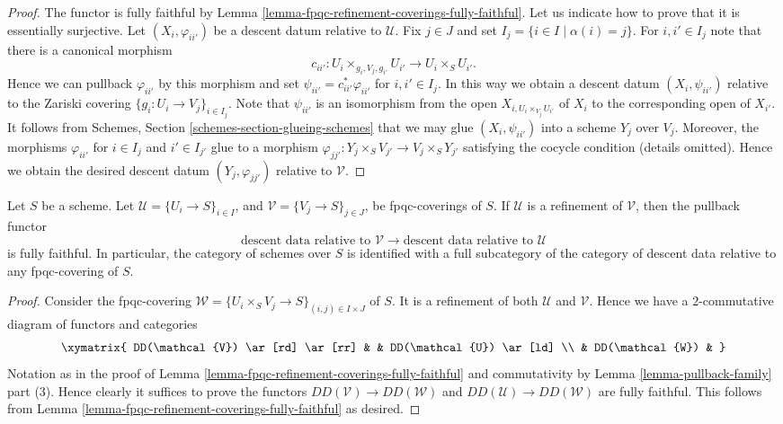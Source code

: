 \begin{proof}
The functor is fully faithful by
Lemma \ref{lemma-fpqc-refinement-coverings-fully-faithful}.
Let us indicate how to prove that it is essentially surjective.
Let $(X_i, \varphi_{ii'})$ be a descent datum relative to $\mathcal{U}$.
Fix $j \in J$ and set $I_j = \{i \in I \mid \alpha(i) = j\}$.
For $i, i' \in I_j$ note that there is a canonical morphism
$$
c_{ii'} : U_i \times_{g_i, V_j, g_{i'}} U_{i'} \to U_i \times_S U_{i'}.
$$
Hence we can pullback $\varphi_{ii'}$ by this morphism
and set $\psi_{ii'} = c_{ii'}^*\varphi_{ii'}$ for $i, i' \in I_j$.
In this way we obtain a descent datum $(X_i, \psi_{ii'})$
relative to the Zariski covering
$\{g_i : U_i \to V_j\}_{i \in I_j}$.
Note that $\psi_{ii'}$ is an isomorphism from the open
$X_{i, U_i \times_{V_j} U_{i'}}$ of $X_i$ to the corresponding
open of $X_{i'}$. It follows from
Schemes, Section \ref{schemes-section-glueing-schemes}
that we may glue $(X_i, \psi_{ii'})$ into a scheme
$Y_j$ over $V_j$. Moreover, the morphisms $\varphi_{ii'}$
for $i \in I_j$ and $i' \in I_{j'}$ glue to a morphism
$\varphi_{jj'} : Y_j \times_S V_{j'} \to V_j \times_S Y_{j'}$
satisfying the cocycle condition (details omitted).
Hence we obtain the desired descent datum
$(Y_j, \varphi_{jj'})$ relative to $\mathcal{V}$.
\end{proof}

\begin{lemma}
\label{lemma-refine-coverings-fully-faithful}
Let $S$ be a scheme.
Let $\mathcal{U} = \{U_i \to S\}_{i \in I}$, and
$\mathcal{V} = \{V_j \to S\}_{j \in J}$,
be fpqc-coverings of $S$.
If $\mathcal{U}$ is a refinement of $\mathcal{V}$,
then the pullback functor
$$
\text{descent data relative to }
\mathcal{V}
\longrightarrow
\text{descent data relative to }
\mathcal{U}
$$
is fully faithful.
In particular, the category of schemes over $S$
is identified with a full subcategory of the category
of descent data relative to any fpqc-covering of $S$.
\end{lemma}

\begin{proof}
Consider the fpqc-covering
$\mathcal{W} = \{U_i \times_S V_j \to S\}_{(i, j) \in I \times J}$ of $S$.
It is a refinement of both $\mathcal{U}$ and $\mathcal{V}$.
Hence we have a $2$-commutative diagram of functors and categories
$$
\xymatrix{
DD(\mathcal{V}) \ar[rd] \ar[rr] & & DD(\mathcal{U}) \ar[ld] \\
& DD(\mathcal{W}) &
}
$$
Notation as in the proof of
Lemma \ref{lemma-fpqc-refinement-coverings-fully-faithful} and
commutativity by Lemma \ref{lemma-pullback-family} part (3).
Hence clearly it suffices to prove the functors
$DD(\mathcal{V}) \to DD(\mathcal{W})$ and
$DD(\mathcal{U}) \to DD(\mathcal{W})$ are fully faithful.
This follows from
Lemma \ref{lemma-fpqc-refinement-coverings-fully-faithful}
as desired.
\end{proof}

